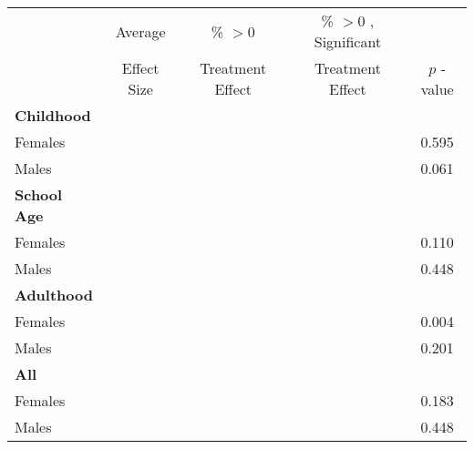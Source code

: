 \begin{tabular}{l c c c c}
\toprule
 & Average & \% $ >0 $ & \% $ >0 $ , Significant & \citet{Rosenbaum_2005_Distribution_JRSS} \\
 & Effect Size & Treatment Effect & Treatment Effect & $ p $ -value \\
\midrule
\textbf{Childhood} & & & & \\
\quad Females &   &  &  &     0.595 \\
\quad Males &   &  &  &     0.061 \\
\midrule
\textbf{School Age} & & & & \\
\quad Females &   &  &  &     0.110 \\
\quad Males &   &  &  &     0.448 \\
\midrule
\textbf{Adulthood} & & & & \\
\quad Females &   &  &  &     0.004 \\
\quad Males &   &  &  &     0.201 \\
\midrule
\textbf{All} & & & & \\
\quad Females &   &  &  &     0.183 \\
\quad Males &   &  &  &     0.448 \\
\bottomrule
\end{tabular}

